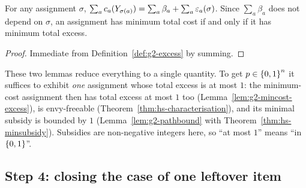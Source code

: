 \begin{lemma}
\label{lem:g2-mincost-excess}
For any assignment $\sigma$, $\sum_a c_a(Y_{\sigma(a)}) = \sum_a \beta_a +
\sum_a \varepsilon_a(\sigma)$. Since $\sum_a \beta_a$ does not depend on
$\sigma$, an assignment has minimum total cost if and only if it has minimum
total excess.
\end{lemma}
\begin{proof}
Immediate from Definition~\ref{def:g2-excess} by summing.
\end{proof}

These two lemmas reduce everything to a single quantity. To get $p \in
\left\{0,1\right\}^n$ it suffices to exhibit \emph{one} assignment whose total excess
is at most $1$: the minimum-cost assignment then has total excess at most $1$
too (Lemma~\ref{lem:g2-mincost-excess}), is envy-freeable
(Theorem~\ref{thm:hs-characterisation}), and its minimal subsidy is bounded by $1$
(Lemma~\ref{lem:g2-pathbound} with Theorem~\ref{thm:hs-minsubsidy}). Subsidies are
non-negative integers here, so ``at most $1$'' means ``in $\left\{0,1\right\}$''.

\subsection{Step 4: closing the case of one leftover item}
\label{sec:g2-r1}


